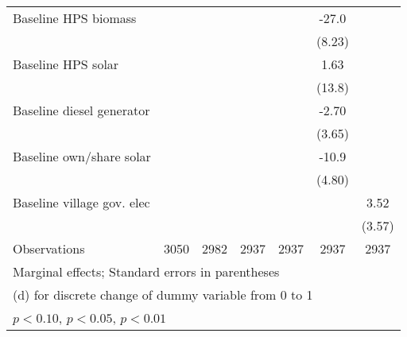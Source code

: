 \begin{table}[htbp]
\begin{tabular*}{1\hsize}{@{\hskip\tabcolsep\extracolsep\fill}l*{6}{c}}
Baseline HPS biomass&                  &                  &                  &                  &    -27.0\sym{***}&                  \\
                &                  &                  &                  &                  &   (8.23)         &                  \\
Baseline HPS solar&                  &                  &                  &                  &     1.63         &                  \\
                &                  &                  &                  &                  &   (13.8)         &                  \\
Baseline diesel generator&                  &                  &                  &                  &    -2.70         &                  \\
                &                  &                  &                  &                  &   (3.65)         &                  \\
Baseline own/share solar&                  &                  &                  &                  &    -10.9\sym{**} &                  \\
                &                  &                  &                  &                  &   (4.80)         &                  \\
Baseline village gov. elec&                  &                  &                  &                  &                  &     3.52         \\
                &                  &                  &                  &                  &                  &   (3.57)         \\
\midrule
Observations    &     3050         &     2982         &     2937         &     2937         &     2937         &     2937         \\
\bottomrule
\multicolumn{7}{l}{\footnotesize Marginal effects; Standard errors in parentheses}\\
\multicolumn{7}{l}{\footnotesize  (d) for discrete change of dummy variable from 0 to 1}\\
\multicolumn{7}{l}{\footnotesize \sym{*} \(p<0.10\), \sym{**} \(p<0.05\), \sym{***} \(p<0.01\)}\\
\end{tabular*}
\end{table}
